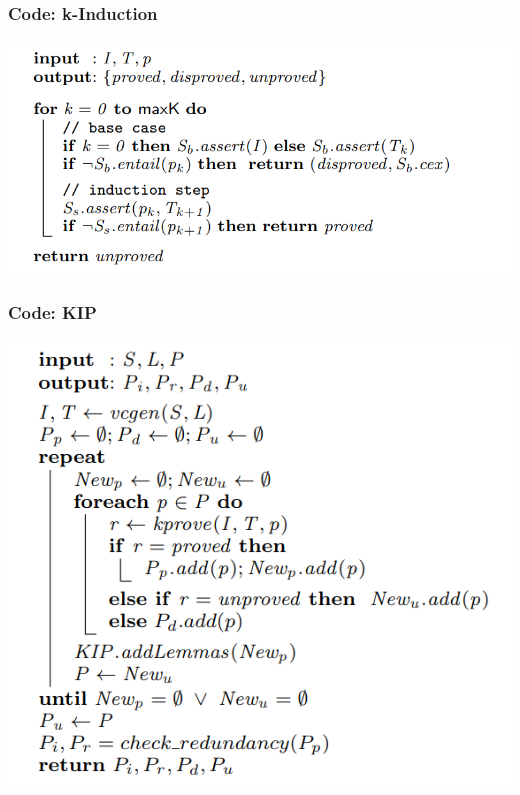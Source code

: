 \documentclass[11pt]{beamer}
\begin{document}
\begin{frame}\frametitle{Code: k-Induction}
\begin{center}
\includegraphics[scale=0.4]{8.png}
\end{center}
\end{frame}

\begin{frame}\frametitle{Code: KIP}
\begin{center}
\includegraphics[scale=0.4]{9.png}
\end{center}
\end{frame}
\end{document}
